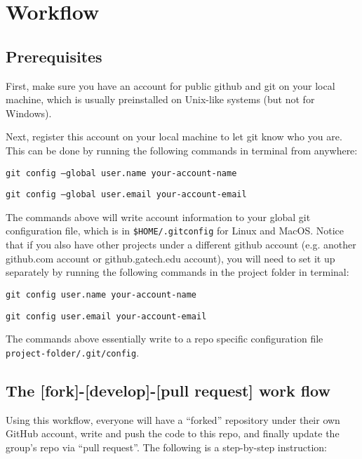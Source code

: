 \documentclass{article}
\begin{document}
\section{Workflow}

\subsection{Prerequisites}

First, make sure you have an account for public github and git on your local machine,
which is usually preinstalled on Unix-like systems (but not for Windows).

Next, register this account on your local machine to let git know who you are.
This can be done by running the following commands in terminal from anywhere:

\texttt{git config --global user.name your-account-name}

\texttt{git config --global user.email your-account-email}

The commands above will write account information to your global git configuration file, which is in \texttt{\$HOME/.gitconfig}
for Linux and MacOS.
Notice that if you also have other projects under a different github account (e.g. another github.com account
or github.gatech.edu account), you will need to set it up separately by running the following
commands in the project folder in terminal:

\texttt{git config user.name your-account-name}

\texttt{git config user.email your-account-email}

The commands above essentially write to a repo specific configuration file \texttt{project-folder/.git/config}.

\subsection{The [fork]-[develop]-[pull request] work flow}

Using this workflow, everyone will have a ``forked'' repository under their own GitHub account,
write and push the code to this repo, and finally update the group's repo via ``pull request''.
The following is a step-by-step instruction:
\end{document}
